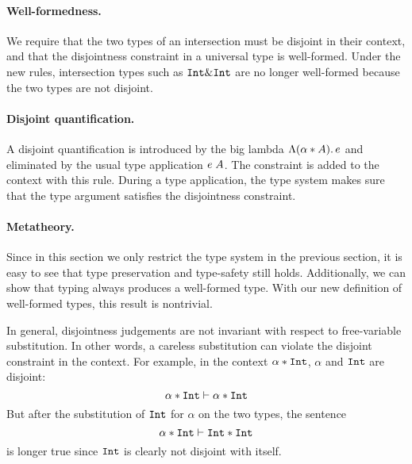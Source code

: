 
\paragraph{Well-formedness.}
We require that the two types of an intersection must be disjoint in their
context, and that the disjointness constraint in a universal type is well-formed.
Under the new rules, intersection types such as $\texttt{Int} \& \texttt{Int}$ are no
longer well-formed because the two types are not disjoint.

\paragraph{Disjoint quantification.} A disjoint quantification is introduced by
the big lambda $\Lambda (\alpha * A).\, e$ and eliminated by the usual type
application $e \; A$. The constraint is added to the context with this rule.
During a type application, the type system makes sure that the type argument
satisfies the disjointness constraint.

\paragraph{Metatheory.} Since in this section we only restrict the type
system in the
previous section, it is easy to see that type preservation and type-safety still
holds. Additionally, we can show that typing always produces a well-formed type.
With our new definition of well-formed types, this result is nontrivial.

In general, disjointness judgements are not invariant with respect to
free-variable substitution. In other words, a careless substitution can violate
the disjoint constraint in the context. For example, in the context $\alpha
* \texttt{Int}$, $\alpha$ and $\texttt{Int}$ are disjoint:
\[ \alpha * \texttt{Int} \vdash \alpha * \texttt{Int} \]
But after the substitution of $\texttt{Int}$ for $\alpha$ on the two types, the sentence
\[ \alpha * \texttt{Int} \vdash \texttt{Int} * \texttt{Int} \]
is longer true since $\texttt{Int}$ is clearly not disjoint with itself.

